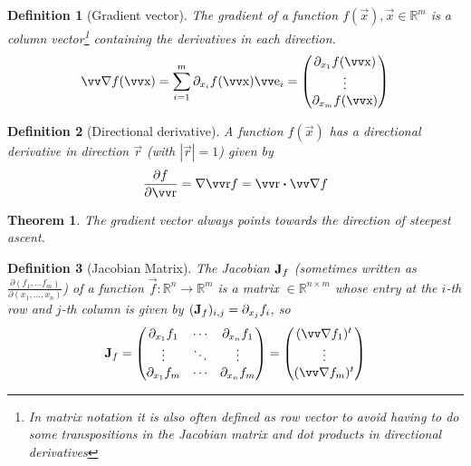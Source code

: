 \documentclass[twocolumn, margin=normal]{tex/hsrzf}
\theoremstyle{fuvarzf}
\newtheorem{theorem}{Theorem}
\newtheorem{definition}{Definition}
\begin{document}
\begin{definition}[Gradient vector]
  The \emph{gradient} of a function \(f(\vec{x}), \vec{x}\in\mathbb{R}^m\) is a
  column vector\footnote{In matrix notation it is also often defined as row
  vector to avoid having to do some transpositions in the Jacobian matrix and
  dot products in directional derivatives} containing the derivatives in each
  direction.
  \[
    \grad f (\vec{x}) = \sum_{i=1}^m \partial_{x_i} f(\vec{x}) \vec{e}_i
      = \begin{pmatrix}
        \partial_{x_1} f(\vec{x}) \\
        \vdots \\
        \partial_{x_m} f(\vec{x}) \\
      \end{pmatrix}
  \]
\end{definition}

\begin{definition}[Directional derivative]
  A function \(f(\vec{x})\) has a directional derivative in direction
  \(\vec{r}\) (with \(|\vec{r}| = 1\)) given by
  \[
    \frac{\partial f}{\partial\vec{r}} 
      = \nabla\vec{r} f = \vec{r} \dotp \grad f
  \]
\end{definition}

\begin{theorem}
  The gradient vector always points towards \emph{the direction of steepest
  ascent}.
\end{theorem}

\begin{definition}[Jacobian Matrix]
  The \emph{Jacobian} \(\bm{\mathrm{J}}_f\) (sometimes written as
  \(\frac{\partial(f_1,\ldots f_m)}{\partial(x_1,\ldots,x_n)}\)) of a function
  \(\vec{f}: \mathbb{R}^n \to \mathbb{R}^m\) is a matrix
  \(\in\mathbb{R}^{n\times m}\) whose entry at the \(i\)-th row and \(j\)-th
  column is given by \((\bm{\mathrm{J}}_f)_{i,j} = \partial_{x_j} f_i\), so
  \[
    \mx{J}_f = \begin{pmatrix}
      \partial_{x_1} f_1 & \cdots & \partial_{x_n} f_1 \\
      \vdots & \ddots & \vdots \\
      \partial_{x_1} f_m & \cdots & \partial_{x_n} f_m \\
    \end{pmatrix}
    = \begin{pmatrix}
      (\grad f_1)^t \\
      \vdots \\
      (\grad f_m)^t \\
    \end{pmatrix}
  \]
\end{definition}
\end{document}
